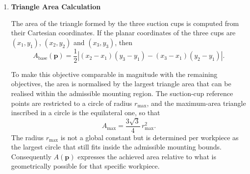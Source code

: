 \begin{enumerate}
Besides the spatial distribution of the grasps, their absolute number is relevant as well,
since a layout that offers more valid grasps is more robust with respect to object pose and
surrounding scene constraints. The evaluated grasp count is taken from the same set that is
used for the diversity metric, i.e.
\begin{equation}
    n =
    \begin{cases}
        |\mathcal{G}_{\mathrm{clustered}}|, & \text{if clustering is performed},\\[2pt]
        |\mathcal{G}_{\mathrm{valid}}|,     & \text{otherwise}.
    \end{cases}
\end{equation}
To keep this quantity comparable with the remaining objectives, it is expressed relative to
the clustering budget $m_{\max}$ (\texttt{max\_cluster}), which is the maximum number of
grasps retained by the clustering stage,
\begin{equation}
    R_g(\mathbf{p}) = \frac{n}{m_{\max}} \in [0,1].
\end{equation}
Since clustering is only applied when more than $m_{\max}$ valid grasps exist, the condition
$n \leq m_{\max}$ holds in both cases and the ratio is bounded by unity without further
clipping. A value of one indicates that the layout produced at least as many valid grasps as
the clustering budget permits, whereas a value of zero corresponds to a layout for which no
valid grasp was found.

\item \textbf{Triangle Area Calculation}

The area of the triangle formed by the three suction cups is computed from their Cartesian
coordinates. If the planar coordinates of the three cups are $(x_1,y_1)$, $(x_2,y_2)$ and
$(x_3,y_3)$, then
\begin{equation}
    A_{\mathrm{base}}(\mathbf{p}) =
    \frac{1}{2}
    \left|
        (x_2 - x_1)(y_3 - y_1) - (x_3 - x_1)(y_2 - y_1)
    \right|.
\end{equation}

To make this objective comparable in magnitude with the remaining objectives, the area is
normalised by the largest triangle area that can be realised within the admissible mounting
region. The suction-cup reference points are restricted to a circle of radius $r_{\max}$,
and the maximum-area triangle inscribed in a circle is the equilateral one, so that
\begin{equation}
    A_{\max} = \frac{3\sqrt{3}}{4}\, r_{\max}^{2}.
\end{equation}
The radius $r_{\max}$ is not a global constant but is determined per workpiece as the
largest circle that still fits inside the admissible mounting bounds. Consequently
$A(\mathbf{p})$ expresses the achieved area relative to what is geometrically possible for
that specific workpiece.


\end{enumerate}
